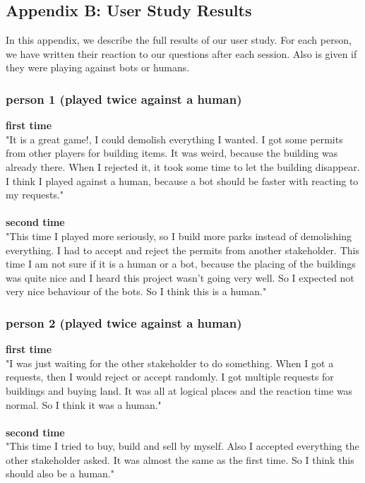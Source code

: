 \subsection{Appendix B: User Study Results}
In this appendix, we describe the full results of our user study. For each person, we have written their reaction to our questions after each session. Also is given if they were playing against bots or humans.
\subsubsection{person 1 (played twice against a human)}
\textbf{first time}\\
"It is a great game!, I could demolish everything I wanted. I got some permits from other players for building items. It was weird, because the building was already there. When I rejected it, it took some time to let the building disappear. I think I played against a human, because a bot should be faster with reacting to my requests."
\\ \\
\textbf{second time}\\
"This time I played more seriously, so I build more parks instead of demolishing everything. I had to accept and reject the permits from another stakeholder. This time I am not sure if it is a human or a bot, because the placing of the buildings was quite nice and I heard this project wasn't going very well. So I expected not very nice behaviour of the bots. So I think this is a human."

\subsubsection{person 2 (played twice against a human)}
\textbf{first time}\\
"I was just waiting for the other stakeholder to do something. When I got a requests, then I would reject or accept randomly. I got multiple requests for buildings and buying land. It was all at logical places and the reaction time was normal. So I think it was a human."
\\ \\
\textbf{second time}\\
"This time I tried to buy, build and sell by myself. Also I accepted everything the other stakeholder asked. It was almost the same as the first time. So I think this should also be a human."

